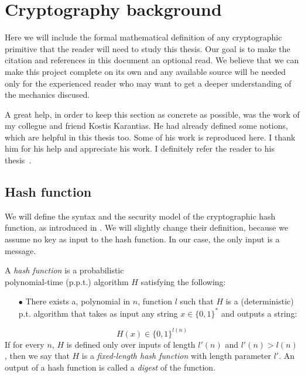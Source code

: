 \section{Cryptography background} \label{ch:math}
%
Here we will include the formal mathematical definition of any cryptographic primitive that the reader will need to study this thesis. Our goal is to make the citation and references in this document an optional read. We believe that we can make this project complete on its own and any available source will be needed only for the experienced reader who may want to get a deeper understanding of the mechanics discused.

A great help, in order to keep this section as concrete as possible, was the work of my collegue and friend Kostis Karantias. He had already defined some notions, which are helpful in this thesis too. Some of his work is reproduced here. I thank him for his help and appreciate his work. I definitely refer the reader to his thesis~\cite{gtklocker}.
%
\subsection{Hash function}
%
We will define the syntax and the security model of the cryptographic hash function, as introduced in \cite{Katz:2007:IMC:1206501}. We will slightly change their definition, because we assume no key as input to the hash function. In our case, the only input is a message.
\clearpage
\pagebreak

\begin{definition}
A \emph{hash function} is a probabilistic \\
polynomial-time (p.p.t.) algorithm $H$ satisfying the following:
\begin{itemize}
  \item[$\bullet$] There exists a, polynomial in $n$, function $l$ such that $H$ is a (deterministic) p.t. algorithm that takes as input any string $x \in { \{ 0,1 \}}^*$ and outputs a string:
\end{itemize}
\begin{equation} \nonumber
  H(x) \in { \{ 0,1 \}}^{l(n)}
\end{equation}
If for every $n$, $H$ is defined only over inputs of length $l'(n)$ and $l'(n) > l(n)$, then
we say that $H$ is a \emph{fixed-length hash function} with length parameter $l'$. An output of a hash function is called a \emph{digest} of the function.
\end{definition}

